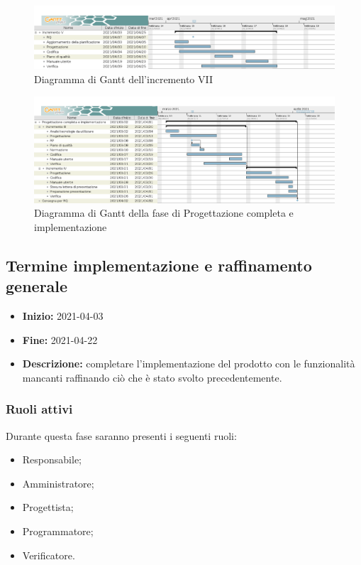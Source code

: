 \begin{figure}[H]
    \centering
    \includegraphics[width=1\linewidth]{res/images/pianificazione/incremento_7.png}
    \caption{Diagramma di Gantt dell'incremento VII}
    \label{fig:_Gantt incremento VII}
\end{figure}

\begin{figure}[H]
    \centering
    \includegraphics[width=1\linewidth]{res/images/pianificazione/progettazione_completa_e_implementazione.png}
    \caption{Diagramma di Gantt della fase di Progettazione completa e implementazione}
    \label{fig:_Gantt progettazione completa e implementazione}
\end{figure}



\subsection{Termine implementazione e raffinamento generale} \label{_pianificazioneTermineImplementazione}
\begin{itemize}
    \item [] \textbf{Inizio:} 2021-04-03
    \item [] \textbf{Fine:} 2021-04-22
    \item [] \textbf{Descrizione:} completare l'implementazione del prodotto con le funzionalità mancanti raffinando ciò che è stato svolto precedentemente.
\end{itemize}

\subsubsection{Ruoli attivi}
Durante questa fase saranno presenti i seguenti ruoli:
\begin{itemize}
    \item Responsabile;
    \item Amministratore;
    \item Progettista;
    \item Programmatore;
    \item Verificatore.
\end{itemize}

